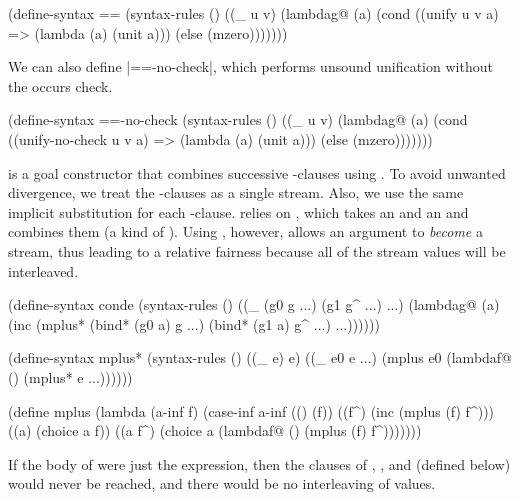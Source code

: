 \schemedisplayspace
\begin{schemedisplay}
(define-syntax ==
  (syntax-rules ()
    ((_ u v)
     (lambdag@ (a)
       (cond
         ((unify u v a) => (lambda (a) (unit a)))
         (else (mzero)))))))
\end{schemedisplay}

We can also define \scheme|==-no-check|, which performs unsound
unification without the occurs check.

\schemedisplayspace
\begin{schemedisplay}
(define-syntax ==-no-check
  (syntax-rules ()
    ((_ u v) 
     (lambdag@ (a)
       (cond
         ((unify-no-check u v a) => (lambda (a) (unit a)))
         (else (mzero)))))))
\end{schemedisplay}

 is a goal constructor that combines successive
-clauses using .  To avoid unwanted
divergence, we treat the -clauses as a single
 stream.  Also, we use the same implicit substitution
for each -clause.   relies on
, which takes an  and an 
and combines them (a kind of ).  Using
, however, allows an argument to \emph{become} a
stream, thus leading to a relative fairness because all of the
stream values will be interleaved.  

\schemedisplayspace
\begin{schemedisplay}
(define-syntax conde
  (syntax-rules ()
    ((_ (g0 g ...) (g1 g^ ...) ...)
     (lambdag@ (a) 
       (inc 
         (mplus* (bind* (g0 a) g ...) (bind* (g1 a) g^ ...) ...))))))
\end{schemedisplay}

\begin{schemedisplay}
(define-syntax mplus*
  (syntax-rules ()
    ((_ e) e)
    ((_ e0 e ...) (mplus e0 (lambdaf@ () (mplus* e ...))))))

(define mplus
  (lambda (a-inf f)
    (case-inf a-inf
      (() (f))
      ((f^) (inc (mplus (f) f^)))
      ((a) (choice a f))
      ((a f^) (choice a (lambdaf@ () (mplus (f) f^)))))))
\end{schemedisplay}
\vspace{4.3pt}
\noindent If the body of  were just the 
expression, then the  clauses of ,
, and  (defined below) would never be
reached, and there would be no interleaving of values.

